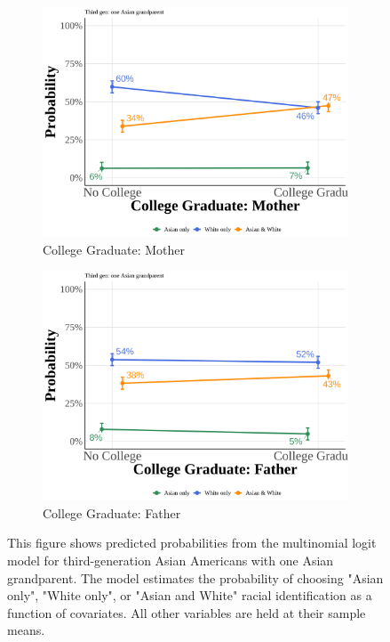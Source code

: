 \begin{center}
\begin{figure}[!htb]
\vspace{0.5cm}

\begin{subfigure}{.48\textwidth}
\caption{College Graduate: Mother}
\centering
\includegraphics[width=1\linewidth]{simple_pp_MomGradCollege_third_one.png}
\end{subfigure}
\hfill
\begin{subfigure}{.48\textwidth}
\caption{College Graduate: Father}
\centering
\includegraphics[width=1\linewidth]{simple_pp_DadGradCollege_third_one.png}
\end{subfigure}

\caption*{\footnotesize{This figure shows predicted probabilities from the multinomial logit model for third-generation Asian Americans with one Asian grandparent. The model estimates the probability of choosing "Asian only", "White only", or "Asian and White" racial identification as a function of covariates. All other variables are held at their sample means.}}
\end{figure}
\end{center}


